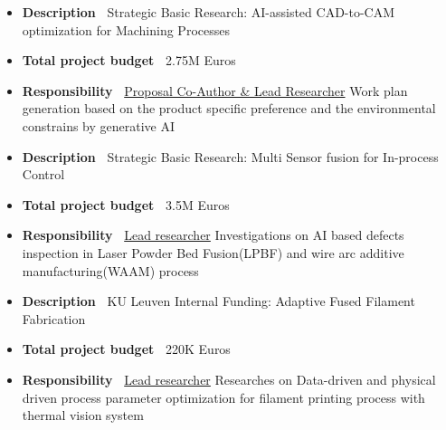 \documentclass{resume}
\begin{document}

\label{AutoCAM}
\begin{itemize}[parsep=0.5ex]
  \item \textbf{Description~} Strategic Basic Research: AI-assisted CAD-to-CAM optimization for Machining Processes
  \item \textbf{Total project budget~} \SLASH2.75M Euros
  \item \textbf{Responsibility~} \underline{Proposal Co-Author \& Lead Researcher} Work plan generation based on the product specific preference and the environmental constrains by generative AI
\end{itemize}

\label{MuSIC}
\begin{itemize}[parsep=0.5ex]
  \item \textbf{Description~} Strategic Basic Research: Multi Sensor fusion for In-process Control
  \item \textbf{Total project budget~} \SLASH3.5M Euros
  \item \textbf{Responsibility~} \underline{Lead researcher} Investigations on AI based defects inspection in Laser Powder Bed Fusion(LPBF) and  wire arc additive manufacturing(WAAM) process
\end{itemize}

\label{AF3}
\begin{itemize}[parsep=0.5ex]
  \item \textbf{Description~} KU Leuven Internal Funding: Adaptive Fused Filament Fabrication
  \item \textbf{Total project budget~} \SLASH220K Euros
  \item \textbf{Responsibility~} \underline{Lead researcher} Researches on Data-driven and physical driven process parameter optimization for filament printing process with thermal vision system
\end{itemize}
\end{document}
